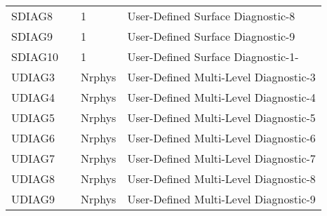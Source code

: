 \begin{tabular}{llll}
 SDIAG8   &             &    1  
         &\begin{minipage}[t]{3in}
          {User-Defined Surface Diagnostic-8} 
         \end{minipage}\\
 SDIAG9   &             &    1  
         &\begin{minipage}[t]{3in}
          {User-Defined Surface Diagnostic-9} 
         \end{minipage}\\
 SDIAG10  &             &    1  
         &\begin{minipage}[t]{3in}
          {User-Defined Surface Diagnostic-1-} 
         \end{minipage}\\
 UDIAG3   &             &    Nrphys  
         &\begin{minipage}[t]{3in}
          {User-Defined Multi-Level Diagnostic-3} 
         \end{minipage}\\
 UDIAG4   &             &    Nrphys  
         &\begin{minipage}[t]{3in}
          {User-Defined Multi-Level Diagnostic-4} 
         \end{minipage}\\
 UDIAG5   &             &    Nrphys  
         &\begin{minipage}[t]{3in}
          {User-Defined Multi-Level Diagnostic-5} 
         \end{minipage}\\
 UDIAG6   &             &    Nrphys  
         &\begin{minipage}[t]{3in}
          {User-Defined Multi-Level Diagnostic-6} 
         \end{minipage}\\
 UDIAG7   &             &    Nrphys  
         &\begin{minipage}[t]{3in}
          {User-Defined Multi-Level Diagnostic-7} 
         \end{minipage}\\
 UDIAG8   &             &    Nrphys  
         &\begin{minipage}[t]{3in}
          {User-Defined Multi-Level Diagnostic-8} 
         \end{minipage}\\
 UDIAG9   &             &    Nrphys  
         &\begin{minipage}[t]{3in}
          {User-Defined Multi-Level Diagnostic-9} 
         \end{minipage}\\

\end{tabular}
